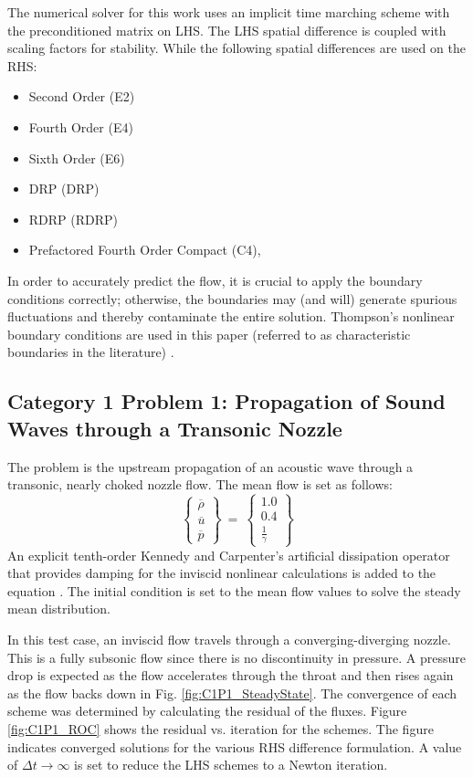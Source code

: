 \documentclass[conf]{new-aiaa}
\begin{document}
The numerical solver for this work uses an implicit time marching scheme with
the preconditioned matrix on LHS. 
The LHS spatial difference is coupled with scaling factors for stability. 
While the following spatial differences are used on the RHS:
\begin{itemize}
	\item Second Order (E2)
	\item Fourth Order (E4)
	\item Sixth Order (E6)
	\item DRP  (DRP)
	\item RDRP  (RDRP)
	\item Prefactored Fourth Order Compact (C4), \cite{Hixon_PreFactor}
\end{itemize}
In order to accurately predict the flow, it is crucial to apply the boundary conditions correctly; otherwise, the boundaries may (and will) generate spurious fluctuations and thereby contaminate the entire solution. 
Thompson's nonlinear boundary conditions are used in this paper (referred to as characteristic boundaries in the literature) \cite{Thompson1, Thompson2}.  

\subsection{Category 1 Problem 1: Propagation of Sound Waves through a Transonic Nozzle}

The problem is the upstream propagation of an acoustic wave through a transonic, nearly choked nozzle flow. 
The mean flow is set as follows:
\begin{equation*}
	\left\{
	\begin{matrix}
		\overline{\rho} \\
		\overline{u} \\
		\overline{p}
	\end{matrix}
	\right\}~=~
	\left\{
	\begin{matrix}
		1.0 \\
		0.4 \\
		\frac{1}{\gamma}
	\end{matrix}
	\right\}
\end{equation*}
An explicit tenth-order Kennedy and Carpenter's artificial dissipation operator that provides damping for the inviscid nonlinear calculations is added to the equation \cite{Kennedy_Carp}. The initial condition is set to the mean flow values to solve the steady mean distribution. 

In this test case, an inviscid flow travels through a converging-diverging nozzle. 
This is a fully subsonic flow since there is no discontinuity in pressure.
A pressure drop is expected as the flow accelerates through the throat and then rises again as the flow backs down in Fig. \ref{fig:C1P1_SteadyState}.  
The convergence of each scheme was determined by calculating the residual of the fluxes. 
Figure \ref{fig:C1P1_ROC} shows the residual vs. iteration for the schemes. 
The figure indicates converged solutions for the various RHS difference formulation. 
A value of $\Delta{t}\to\infty$ is set to reduce the LHS schemes to a Newton iteration. 
\end{document}
